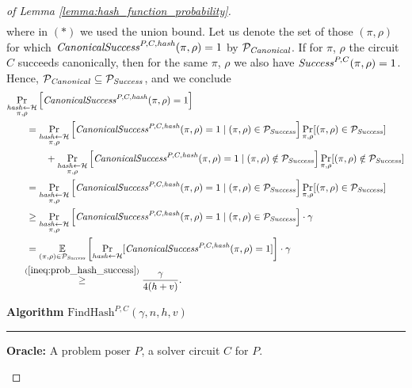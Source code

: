 \begin{proof}[of Lemma \ref{lemma:hash_function_probability}]
\begin{align}
\end{align}
where in $(*)$ we used the union bound.
Let us denote the set of those $(\pi,\rho)$ for which $\operatorname{\mathit{CanonicalSuccess}}^{P, C, \operatorname{\mathit{hash}}}(\pi, \rho) = 1$ by $\mathcal{P}_{\mathit{Canonical}}$.
If for $\pi$, $\rho$ the circuit $C$ succeeds canonically, then for the same $\pi$, $\rho$ we also have $\operatorname{\mathit{Success}}^{P, C}(\pi, \rho) = 1$.
Hence, $\mathcal{P}_{\mathit{Canonical}} \subseteq \mathcal{P}_{\mathit{Success}}$, and we conclude
\begin{align}
  \label{ineq:hash_high_prob}
&\underset{\substack{\hash \leftarrow \cH \\ \pi, \rho}}{\Pr}\left[\CanonicalSuccess^{P, C, \hash}(\pi, \rho) = 1\right] \notag\\
&\IndI = \underset{\substack{\hash \leftarrow \cH \\ \pi, \rho}}{\Pr}\left[\CanonicalSuccess^{P,C,\hash}(\pi, \rho) = 1 \mid (\pi, \rho) \in \cP_{\mathit{Success}}\right]
\underset{\pi, \rho}{\Pr}[(\pi, \rho) \in \cP_{\mathit{Success}}] \notag\\
&\IndII + \underset{\substack{\hash \leftarrow \cH \\ \pi, \rho}}{\Pr}\left[\CanonicalSuccess^{P,C,\hash}(\pi, \rho) = 1 \mid (\pi, \rho) \notin \cP_{\mathit{Success}} \right]
\underset{\pi, \rho}{\Pr}[(\pi, \rho) \notin \cP_{\mathit{Success}}] \notag\\
%
&\IndI = \underset{\substack{\hash \leftarrow \cH \\ \pi, \rho}}{\Pr}\left[\CanonicalSuccess^{P,C,\hash}(\pi, \rho) = 1 \mid (\pi, \rho) \in \cP_{\mathit{Success}}\right]
\underset{\pi, \rho}{\Pr}[(\pi, \rho) \in \cP_{\mathit{Success}}] \notag\\
%
&\IndI \geq
\underset{\substack{\hash \leftarrow \cH \\ \pi, \rho}}{\Pr}\left[\CanonicalSuccess^{P,C,\hash}(\pi, \rho) = 1 \mid (\pi, \rho) \in \cP_{\mathit{Success}}\right] \cdot \gamma \notag\\
&\IndI =
\underset{(\pi, \rho) \in \cP_{\mathit{Success}}}
{\mathbb{E}}\left[\underset{\hash \leftarrow \cH}{\Pr}[\CanonicalSuccess^{P,C,\hash}(\pi, \rho) = 1] \right] \cdot \gamma \notag\\
&\hphantom{aaa}\stackrel{(\ref{ineq:prob_hash_success})}{\geq} \frac{\gamma}{4(h+v)}. %
\end{align}
%
\begin{codeblock}
  \textbf{Algorithm} $\text{FindHash}^{P,C}(\gamma, n, h, v)$
  \medskip\hrule
  \textbf{Oracle:} A problem poser $P$, a solver circuit $C$ for $P$.\\

\end{codeblock}
\end{proof}
